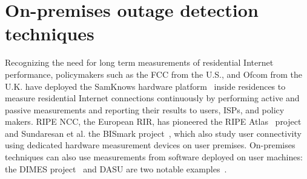 



\section{On-premises outage detection techniques}

Recognizing the need for long term measurements of residential
Internet performance, policymakers such as the FCC from the U.S., and
Ofcom from the U.K. have deployed the SamKnows hardware
platform~\cite{samknows} inside residences to measure residential
Internet connections continuously by performing active and passive
measurements and reporting their results to users, ISPs, and policy
makers. RIPE NCC, the European RIR, has pioneered the RIPE
Atlas~\cite{atlas} project and Sundaresan et al. the BISmark
project~\cite{bismark-main-bib}, which also study user connectivity
using dedicated hardware measurement devices on user
premises. On-premises techniques can also use measurements from
software deployed on user machines: the DIMES project~\cite{netdimes}
and DASU are two notable examples~\cite{Dasu:NSDI2013}.



